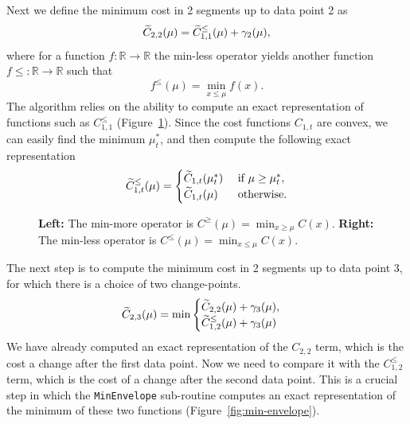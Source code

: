 \documentclass{article}
\newcommand{\RR}{\mathbb R}
\begin{document}
Next we define the minimum cost in 2 segments up to data point 2 as
\begin{equation*}
  \label{eq:C22}
  \widetilde{C}_{2,2}(\mu) = \widetilde{C}_{1,1}^{\leq}(\mu) + \gamma_2(\mu),
\end{equation*}
where for a function $f:\RR\rightarrow\RR$ the min-less operator
yields another function $f\leq:\RR\rightarrow\RR$ such that
\begin{equation}
  \label{eq:min-less}
  f^{\leq}(\mu) = \min_{x\leq \mu} f(x).
\end{equation}
The algorithm relies on the ability to compute an exact representation
of functions such as $C_{1,1}^{\leq}$
(Figure~\ref{fig:min-operators}). Since the cost functions $C_{1,t}$
are convex, we can easily find the minimum $\mu_t^*$, and then compute
the following exact representation
\begin{equation*}
  \widetilde{C}_{1,t}^\leq(\mu)=
  \begin{cases}
    \widetilde{C}_{1,t}(\mu_t^*) & \text{ if } \mu \geq \mu_t^*,\\
    \widetilde{C}_{1,t}(\mu) & \text{ otherwise.}
  \end{cases}
\end{equation*}

\begin{figure}[!t]
  \parbox{3in}{
    \begin{center}
    
    \end{center}
  }
  \parbox{3in}{
    \begin{center}
      
    \end{center}
  }
  \caption{\label{fig:min-operators} \textbf{Left:} The min-more
    operator is $C^{\geq}(\mu)=\min_{x\geq \mu}C(x)$. \textbf{Right:}
    The min-less operator is $C^{\leq}(\mu)=\min_{x\leq
      \mu}C(x)$.}
\end{figure}

The next step is to compute the minimum cost in 2 segments up to data
point 3, for which there is a choice of two change-points.
\begin{equation*}
  \widetilde{C}_{2,3}(\mu) = \min
  \begin{cases}
    \widetilde{C}_{2,2}(\mu)+\gamma_3(\mu), \\
    \widetilde{C}_{1,2}^{\leq}(\mu)+\gamma_3(\mu)
  \end{cases}
\end{equation*}
We have already computed an exact representation of the $C_{2,2}$
term, which is the cost a change after the first data point. Now we
need to compare it with the $C_{1,2}^{\leq}$ term, which is the cost
of a change after the second data point. This is a crucial step in
which the \texttt{MinEnvelope} sub-routine computes an exact
representation of the minimum of these two functions
(Figure~\ref{fig:min-envelope}).
\end{document}
